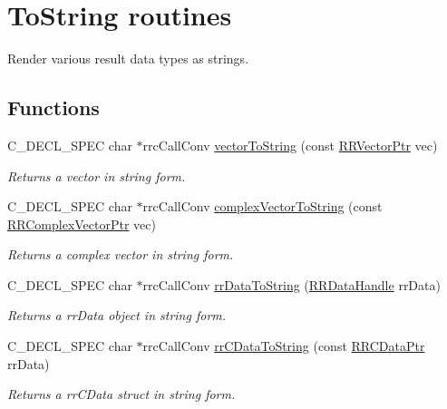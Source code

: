 \hypertarget{group__to_string}{\section{To\-String routines}
\label{group__to_string}
}


Render various result data types as strings.  


\subsection*{Functions}
\begin{DoxyCompactItemize}
\item 
C\-\_\-\-D\-E\-C\-L\-\_\-\-S\-P\-E\-C char $\ast$rrc\-Call\-Conv \hyperlink{group__to_string_gaff70db9c262110e72d1cf090b04d05a3}{vector\-To\-String} (const \hyperlink{rrc__types_8h_a3be72d6006034fd349f753d2bf441bf7}{R\-R\-Vector\-Ptr} vec)
\begin{DoxyCompactList}\small\item\em Returns a vector in string form. \end{DoxyCompactList}\item 
C\-\_\-\-D\-E\-C\-L\-\_\-\-S\-P\-E\-C char $\ast$rrc\-Call\-Conv \hyperlink{group__to_string_gaef1d1f1789f4c5bca4e6b7af4bf53885}{complex\-Vector\-To\-String} (const \hyperlink{rrc__types_8h_ae05c63419a6ca0575eb327fd04dae4b5}{R\-R\-Complex\-Vector\-Ptr} vec)
\begin{DoxyCompactList}\small\item\em Returns a complex vector in string form. \end{DoxyCompactList}\item 
C\-\_\-\-D\-E\-C\-L\-\_\-\-S\-P\-E\-C char $\ast$rrc\-Call\-Conv \hyperlink{group__to_string_ga41cff9a733e2531a57bc07b12ae4efe0}{rr\-Data\-To\-String} (\hyperlink{rrc__types_8h_ad0beb6fbdd576789fab9cead01d8b9e9}{R\-R\-Data\-Handle} rr\-Data)
\begin{DoxyCompactList}\small\item\em Returns a rr\-Data object in string form. \end{DoxyCompactList}\item 
C\-\_\-\-D\-E\-C\-L\-\_\-\-S\-P\-E\-C char $\ast$rrc\-Call\-Conv \hyperlink{group__to_string_ga9ecd62cd0fd10a179bd2fe5e55f69929}{rr\-C\-Data\-To\-String} (const \hyperlink{rrc__types_8h_a9da8b124eb9c3c0045f8926c6a420b4a}{R\-R\-C\-Data\-Ptr} rr\-Data)
\begin{DoxyCompactList}\small\item\em Returns a rr\-C\-Data struct in string form. \end{DoxyCompactList}\item 

\end{DoxyCompactItemize}
